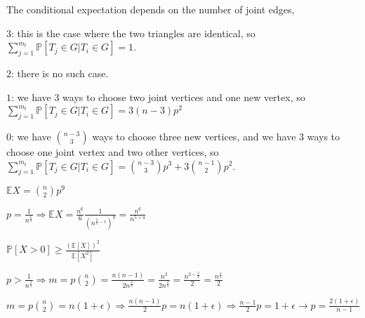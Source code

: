 \documentclass{article}
\begin{document}
The conditional expectation 
depends on the number of joint edges,

$3$: this is the case where the two triangles are identical, so $\sum_{j=1}^{m_t}\mathbb{P}[T_j\in{G}|T_i\in{G}]=1$.

$2$: there is no such case.

$1$: we have $3$ ways to choose two joint vertices and one new vertex, so $\sum_{j=1}^{m_t}\mathbb{P}[T_j\in{G}|T_i\in{G}]=3(n-3)p^2$

$0$: we have $\binom{n-3}{3}$ ways to choose three new vertices, and we have $3$ ways to choose one joint vertex and two other vertices, so $\sum_{j=1}^{m_t}\mathbb{P}[T_j\in{G}|T_i\in{G}]=\binom{n-3}{3}p^3+3\binom{n-1}{2}p^2$.








$\mathbb{E}X=\binom{n}{2}p^9$

$p=\frac{1}{n^{\frac{6}{3}}}\Rightarrow\mathbb{E}X=\frac{n^6}{6}\frac{1}{(n^{\frac{2}{3}-\epsilon})^9}=\frac{n^6}{n^{5+a}}$

$\mathbb{P}[X>0]\geq{\frac{(\mathbb{E}[X])^2}{\mathbb{E}[X^2]}}$

$p>\frac{1}{n^{\frac{2}{3}}}\Rightarrow{m=p\binom{n}{2}}=\frac{n(n-1)}{2n^{\frac{2}{3}}}=\frac{n^2}{2n^{\frac{2}{3}}}=\frac{n^{2-\frac{2}{3}}}{2}=\frac{n^{\frac{4}{3}}}{2}$


$m=p\binom{n}{2}=n(1+\epsilon)\Rightarrow\frac{n(n-1)}{2}p=n(1+\epsilon)\Rightarrow\frac{n-1}{2}p=1+\epsilon\rightarrow{p=\frac{2(1+\epsilon)}{n-1}}$
\end{document}
